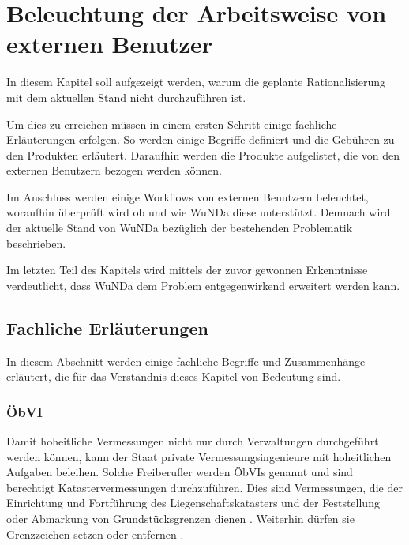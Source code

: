 \chapter{Beleuchtung der Arbeitsweise von externen Benutzer}

In diesem Kapitel soll aufgezeigt werden, warum die geplante Rationalisierung mit dem aktuellen Stand nicht durchzuführen ist.

Um dies zu erreichen müssen in einem ersten Schritt einige fachliche Erläuterungen erfolgen. So werden einige Begriffe definiert und die Gebühren zu den Produkten erläutert. Daraufhin  werden die Produkte aufgelistet, die von den externen Benutzern bezogen werden können.

Im Anschluss werden einige Workflows von externen Benutzern beleuchtet, woraufhin überprüft wird ob und wie \ac{WuNDa} diese unterstützt. Demnach wird der aktuelle Stand von \ac{WuNDa} bezüglich der bestehenden Problematik beschrieben.

Im letzten Teil des Kapitels wird mittels der zuvor gewonnen Erkenntnisse verdeutlicht, dass \ac{WuNDa} dem Problem entgegenwirkend erweitert werden kann. 


\section{Fachliche Erläuterungen}
In diesem Abschnitt werden einige fachliche Begriffe und Zusammenhänge erläutert, die für das Verständnis dieses Kapitel von Bedeutung sind.

\subsection{ÖbVI}
Damit hoheitliche Vermessungen nicht nur durch Verwaltungen durchgeführt werden können, kann der Staat private Vermessungsingenieure mit hoheitlichen Aufgaben beleihen.
Solche Freiberufler werden \acfp{ÖbVI} genannt und sind berechtigt Katastervermessungen durchzuführen. Dies sind Vermessungen, die der Einrichtung und Fortführung des Liegenschaftskatasters und der Feststellung oder Abmarkung von Grundstücksgrenzen dienen \autocite[vgl.][]{bdvi-oebvi}.
Weiterhin dürfen sie Grenzzeichen setzen oder entfernen \autocite[vgl.][]{wolff-oebvi}. 

